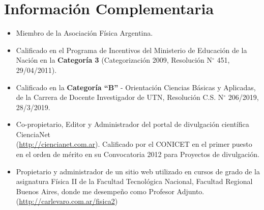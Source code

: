 \section{Información Complementaria}

\begin{itemize}
\item Miembro de la Asociación Física Argentina.

 \item Calificado en el Programa de Incentivos del Ministerio de Educación de la Nación en
la \textbf{Categoría 3} (Categorización 2009, Resolución N$^{\circ}$ 451, 29/04/2011).

\item Calificado en la \textbf{Categoría ``B''} - Orientación Ciencias Básicas y Aplicadas, de la Carrera de Docente Investigador de UTN, Resolución C.S. N$^{\circ}$ 206/2019, 28/3/2019.

\item Co-propietario, Editor y Administrador del portal de divulgación científica CienciaNet \\ (\href{http://ciencianet.com.ar}{http://ciencianet.com.ar}). Calificado por el CONICET en el primer puesto en el orden de mérito en su Convocatoria 2012 para Proyectos de divulgación.

\item Propietario y administrador de un sitio web utilizado en cursos de grado de la asignatura Física II de la Facultad Tecnológica Nacional, Facultad Regional Buenos Aires, donde me desempeño como Profesor Adjunto. (\href{http://carlevaro.com.ar/fisica2}{http://carlevaro.com.ar/fisica2})

\end{itemize}

